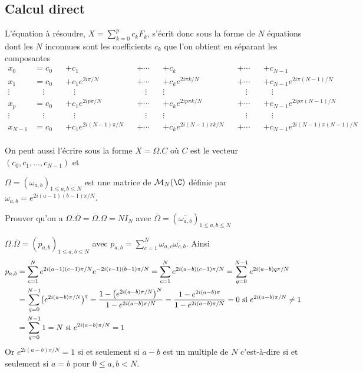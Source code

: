 \subsection{Calcul direct}
L'équation à résoudre, $\displaystyle X =\sum_{k=0}^p c_kF_k$, s'écrit donc sous la forme de $N$ équations dont les $N$ inconnues sont les coefficients $c_k$ que l'on obtient en séparant les composantes
\begin{align*}
x_0&=c_0&&+c_1&&+\cdots&&+c_k&&+\cdots&&+c_{N-1}\\
x_1&=c_0&&+c_1e^{2i\pi/N}&&+\cdots&&+c_ke^{2i\pi k/N}&&+\cdots&&+c_{N-1}e^{2i\pi (N-1)/N}\\
\vdots\ &\quad\vdots&&\quad\vdots&&\quad\vdots&&\vdots&&\quad\vdots&&\quad\vdots\\
x_p&=c_0&&+c_1e^{2ip\pi/N}&&+\cdots&&+c_ke^{2ip\pi k/N}&&+\cdots&&+c_{N-1}e^{2ip\pi (N-1)/N}\\
\vdots\ &\quad\vdots&&\quad\vdots&&\quad\vdots&&\vdots&&\quad\vdots&&\quad\vdots\\
x_{N-1}&=c_0&&+c_1e^{2i(N-1)\pi/N}&&+\cdots&&+c_ke^{2i(N-1)\pi k/N}&&+\cdots&&+c_{N-1}e^{2i(N-1)\pi (N-1)/N}\\
\end{align*}

On peut aussi l'écrire sous la forme $X=\Omega.C$ où $C$ est le vecteur $(c_0,c_1,\ldots,c_{N-1})$ et

$\Omega=(\omega_{a,b})_{1\le a,b\le N}$ est une matrice de ${\cal M}_{N}(\C)$ définie par $\omega_{a,b}=e^{2i(a-1)(b-1)\pi/N}$.
\begin{Exercise}\it 

Prouver qu'on a  $\Omega.\overline \Omega=\overline \Omega.\Omega=NI_N$ avec $\overline \Omega=(\overline{\omega_{a,b}})_{1\le a,b\le N}$
\end{Exercise}
\begin{Answer}

$\Omega.\overline \Omega=(p_{a,b})_{1\le a,b\le N}$ avec $\displaystyle p_{a,b} = \sum_{c=1}^N \omega_{a,c}\overline{\omega_{c,b}}$.
Ainsi
\begin{align*}
p_{a,b}
&= \sum_{c=1}^N e^{2i(a-1)(c-1)\pi/N}e^{-2i(c-1)(b-1)\pi/N}
= \sum_{c=1}^N e^{2i(a-b)(c-1)\pi/N}
= \sum_{q=0}^{N-1} e^{2i(a-b)q\pi/N}\\
&=\sum_{q=0}^{N-1} \bigl(e^{2i(a-b)\pi/N}\bigr)^q
=\frac{1-\bigl(e^{2i(a-b)\pi/N}\bigr)^N}{1-e^{2i(a-b)\pi/N}}
=\frac{1-e^{2i(a-b)\pi}}{1-e^{2i(a-b)\pi/N}}=0\hbox{ si }e^{2i(a-b)\pi/N}\ne 1\\
&=\sum_{q=0}^{N-1}1=N\hbox{ si }e^{2i(a-b)\pi/N}= 1\\
\end{align*}
Or $e^{2i(a-b)\pi/N}= 1$ si et seulement si $a-b$ est un multiple de $N$ c'est-à-dire si et seulement si $a=b$ pour $0\le a,b< N$.
\end{Answer}
\medskip

